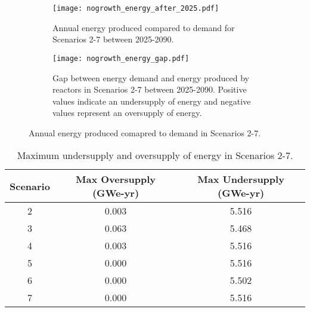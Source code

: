 \begin{figure}
    \centering
    \begin{subfigure}[b]{0.45\textwidth}
        \centering
        \texttt{[image: nogrowth\_energy\_after\_2025.pdf]}
        \caption{Annual energy produced compared to demand for Scenarios 2-7
        between 2025-2090.}
        \label{fig:nogrowth_energy_after_2025}
    \end{subfigure}
    \hfill
    \begin{subfigure}[b]{0.45\textwidth}
        \centering
        \texttt{[image: nogrowth\_energy\_gap.pdf]}
        \caption{Gap between energy demand and energy produced by reactors 
        in Scenarios 2-7 between 2025-2090. Positive values indicate an 
        undersupply of energy and negative values represent an 
        oversupply of energy.}
        \label{fig:nogrowth_energy_gap}
    \end{subfigure}
       \caption{Annual energy produced comapred to demand in Scenarios 2-7.}
       \label{fig:nogrowth_energy}
\end{figure}

\begin{table}
    \centering
    \caption{Maximum undersupply and oversupply of energy in Scenarios 2-7.}
    \label{tab:nogrowth_energy}
    \begin{tabular}{c c c}
        \hline 
        Scenario & Max Oversupply (GWe-yr) & Max Undersupply (GWe-yr) \\
        \hline 
        2 & 0.003 & 5.516 \\
        3 & 0.063 & 5.468 \\
        4 & 0.003 & 5.516 \\
        5 & 0.000 & 5.516 \\
        6 & 0.000 & 5.502 \\
        7 & 0.000 & 5.516 \\
        \hline
        
    \end{tabular}
\end{table}

